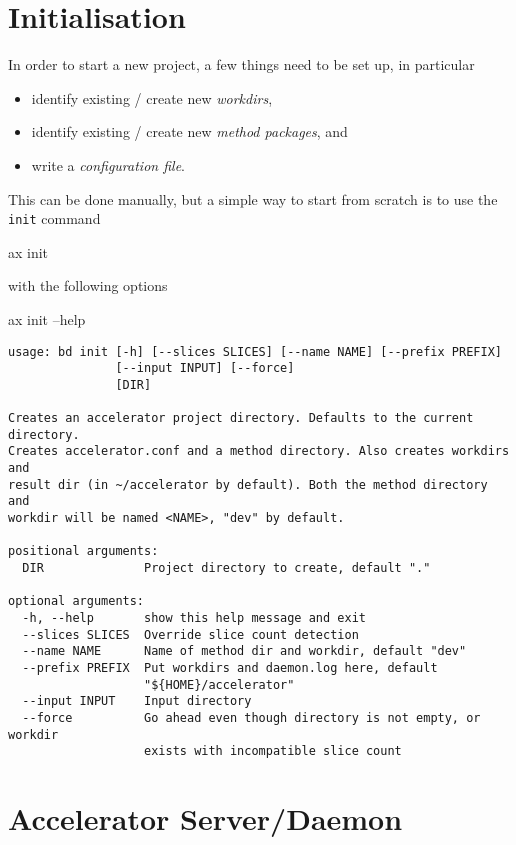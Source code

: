 \section{Initialisation}
\label{sec:initialisation}
In order to start a new project, a few things need to be set up, in
particular
\begin{itemize}
\item[] identify existing / create new \textsl{workdirs},
\item[] identify existing / create new \textsl{method packages}, and
\item[] write a \textsl{configuration file}.
\end{itemize}
This can be done manually, but a simple way to start from scratch is
to use the \texttt{init} command
\begin{shell}
  ax init
\end{shell}
with the following options
\begin{shell}
  ax init --help
\end{shell}
\begin{snugshade}
\begin{verbatim}
usage: bd init [-h] [--slices SLICES] [--name NAME] [--prefix PREFIX]
               [--input INPUT] [--force]
               [DIR]

Creates an accelerator project directory. Defaults to the current directory.
Creates accelerator.conf and a method directory. Also creates workdirs and
result dir (in ~/accelerator by default). Both the method directory and
workdir will be named <NAME>, "dev" by default.

positional arguments:
  DIR              Project directory to create, default "."

optional arguments:
  -h, --help       show this help message and exit
  --slices SLICES  Override slice count detection
  --name NAME      Name of method dir and workdir, default "dev"
  --prefix PREFIX  Put workdirs and daemon.log here, default
                   "${HOME}/accelerator"
  --input INPUT    Input directory
  --force          Go ahead even though directory is not empty, or workdir
                   exists with incompatible slice count
\end{verbatim}
\end{snugshade}



\section{Accelerator Server/Daemon}

